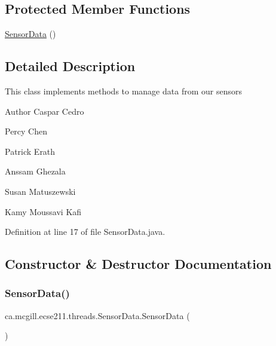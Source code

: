 \subsection*{Protected Member Functions}
\begin{DoxyCompactItemize}
\item 
\hyperlink{classca_1_1mcgill_1_1ecse211_1_1threads_1_1_sensor_data_a11dcdc9c15184e05a9c84fc3958e26b6}{Sensor\+Data} ()
\end{DoxyCompactItemize}


\subsection{Detailed Description}
This class implements methods to manage data from our sensors

\begin{DoxyAuthor}{Author}
Caspar Cedro 

Percy Chen 

Patrick Erath 

Anssam Ghezala 

Susan Matuszewski 

Kamy Moussavi Kafi 
\end{DoxyAuthor}


Definition at line 17 of file Sensor\+Data.\+java.



\subsection{Constructor \& Destructor Documentation}
\mbox{\label{classca_1_1mcgill_1_1ecse211_1_1threads_1_1_sensor_data_a11dcdc9c15184e05a9c84fc3958e26b6}} 
\subsubsection{\texorpdfstring{Sensor\+Data()}{SensorData()}}
{\footnotesize\ttfamily ca.\+mcgill.\+ecse211.\+threads.\+Sensor\+Data.\+Sensor\+Data (\begin{DoxyParamCaption}{ }\end{DoxyParamCaption})\hspace{0.3cm}{\ttfamily [protected]}}

